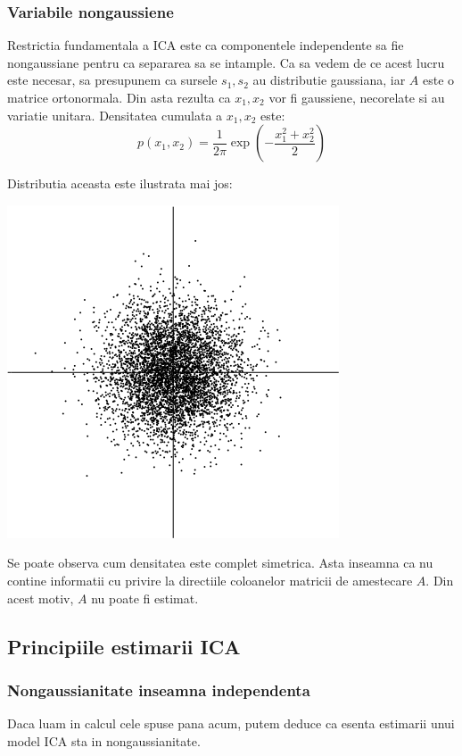 \documentclass[12pt,oneside]{article}
\begin{document}
\subsubsection{Variabile nongaussiene}
Restrictia fundamentala a ICA este ca componentele independente sa fie nongaussiane pentru ca separarea sa se intample. Ca sa vedem de ce acest lucru este necesar, sa presupunem ca sursele $s_1, s_2$ au distributie gaussiana, iar $A$ este o matrice ortonormala. Din asta rezulta ca $x_1,x_2$ vor fi gaussiene, necorelate si au variatie unitara. Densitatea cumulata a $x_1, x_2$ este:
\begin{equation}
	p(x_1,x_2)=\frac{1}{2\pi}\exp(-\frac{x_1^2+x_2^2}{2})
\end{equation}

Distributia aceasta este ilustrata mai jos:
\begin{center}
	\includegraphics[scale=0.9]{multivariate_gaussian_distribution}
 \end{center}
 Se poate observa cum densitatea este complet simetrica. Asta inseamna ca nu contine informatii cu privire la directiile coloanelor matricii de amestecare $A$. Din acest motiv, $A$ nu poate fi estimat.

 \subsection{Principiile estimarii ICA}
 \subsubsection{Nongaussianitate inseamna independenta}
 Daca luam in calcul cele spuse pana acum, putem deduce ca esenta estimarii unui model ICA sta in nongaussianitate.
\end{document}
